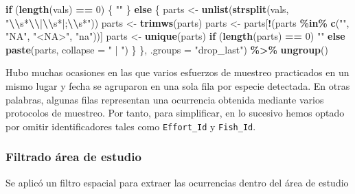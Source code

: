 \documentclass[sn-apa,pdflatex]{sn-jnl}
\newenvironment{Shaded}{\begin{snugshade}}{\end{snugshade}}
\newcommand{\AttributeTok}[1]{\textcolor[rgb]{0.13,0.29,0.53}{#1}}
\newcommand{\ControlFlowTok}[1]{\textcolor[rgb]{0.13,0.29,0.53}{\textbf{#1}}}
\newcommand{\DecValTok}[1]{\textcolor[rgb]{0.00,0.00,0.81}{#1}}
\newcommand{\FunctionTok}[1]{\textcolor[rgb]{0.13,0.29,0.53}{\textbf{#1}}}
\newcommand{\NormalTok}[1]{#1}
\newcommand{\OtherTok}[1]{\textcolor[rgb]{0.56,0.35,0.01}{#1}}
\newcommand{\SpecialCharTok}[1]{\textcolor[rgb]{0.81,0.36,0.00}{\textbf{#1}}}
\newcommand{\StringTok}[1]{\textcolor[rgb]{0.31,0.60,0.02}{#1}}
\begin{document}
\begin{Shaded}
\begin{Highlighting}[]
            \ControlFlowTok{if}\NormalTok{ (}\FunctionTok{length}\NormalTok{(vals) }\SpecialCharTok{==} \DecValTok{0}\NormalTok{) \{}
                \StringTok{""}
\NormalTok{            \} }\ControlFlowTok{else}\NormalTok{ \{}
\NormalTok{                parts }\OtherTok{\textless{}{-}} \FunctionTok{unlist}\NormalTok{(}\FunctionTok{strsplit}\NormalTok{(vals, }\StringTok{"}\SpecialCharTok{\textbackslash{}\textbackslash{}}\StringTok{s*}\SpecialCharTok{\textbackslash{}\textbackslash{}}\StringTok{|}\SpecialCharTok{\textbackslash{}\textbackslash{}}\StringTok{s*|;}\SpecialCharTok{\textbackslash{}\textbackslash{}}\StringTok{s*"}\NormalTok{))}
\NormalTok{                parts }\OtherTok{\textless{}{-}} \FunctionTok{trimws}\NormalTok{(parts)}
\NormalTok{                parts }\OtherTok{\textless{}{-}}\NormalTok{ parts[}\SpecialCharTok{!}\NormalTok{(parts }\SpecialCharTok{\%in\%} \FunctionTok{c}\NormalTok{(}\StringTok{""}\NormalTok{, }\StringTok{"NA"}\NormalTok{, }\StringTok{"\textless{}NA\textgreater{}"}\NormalTok{,}
                  \StringTok{"na"}\NormalTok{))]}
\NormalTok{                parts }\OtherTok{\textless{}{-}} \FunctionTok{unique}\NormalTok{(parts)}
                \ControlFlowTok{if}\NormalTok{ (}\FunctionTok{length}\NormalTok{(parts) }\SpecialCharTok{==} \DecValTok{0}\NormalTok{)}
                  \StringTok{""} \ControlFlowTok{else} \FunctionTok{paste}\NormalTok{(parts, }\AttributeTok{collapse =} \StringTok{" | "}\NormalTok{)}
\NormalTok{            \}}
\NormalTok{        \}, }\AttributeTok{.groups =} \StringTok{"drop\_last"}\NormalTok{) }\SpecialCharTok{\%\textgreater{}\%}
    \FunctionTok{ungroup}\NormalTok{()}
\end{Highlighting}
\end{Shaded}

Hubo muchas ocasiones en las que varios esfuerzos de muestreo
practicados en un mismo lugar y fecha se agruparon en una sola fila por
especie detectada. En otras palabras, algunas filas representan una
ocurrencia obtenida mediante varios protocolos de muestreo. Por tanto,
para simplificar, en lo sucesivo hemos optado por omitir identificadores
tales como \texttt{Effort\_Id} y \texttt{Fish\_Id}.

\subsubsection{Filtrado área de
estudio}\label{filtrado-uxe1rea-de-estudio}

Se aplicó un filtro espacial para extraer las ocurrencias dentro del
área de estudio
\end{document}
